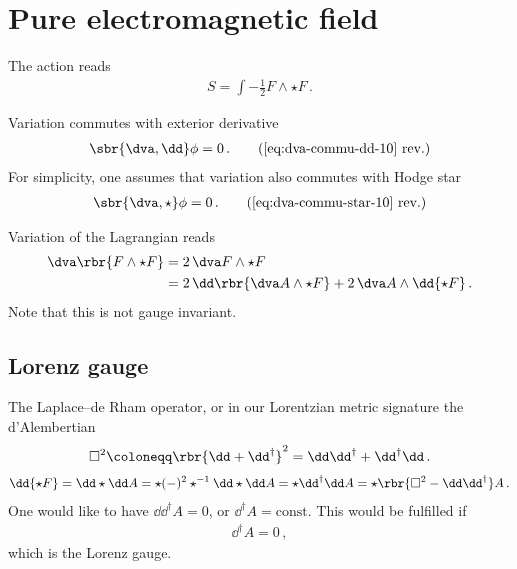 \documentclass[a4paper]{article}
\begin{document}
\section{Pure electromagnetic field}


The action reads
\begin{align}
S = \int -\frac{1}{2} F \wedge \star F\,.
\end{align}

Variation commutes with exterior derivative
\begin{align}
\sbr{\dva, \dd}\phi = 0\,.
\tag{\ref{eq:dva-commu-dd-10} rev.}
\end{align}
For simplicity, one assumes that variation also commutes with Hodge star
\begin{align}
\sbr{\dva, \star}\phi = 0\,.
\tag{\ref{eq:dva-commu-star-10} rev.}
\end{align}

Variation of the Lagrangian reads
\begin{align}
\dva \rbr{F\wedge\star F} &=
	2\,\dva F \wedge \star F
\\ &=
	2\,\dd\rbr{\dva A \wedge \star F} + 2\,\dva A \wedge \dd {\star F}\,.
\end{align}
Note that this is not gauge invariant.

\subsection{Lorenz gauge}
The Laplace--de Rham operator, or in our Lorentzian metric signature the 
d'Alembertian
\begin{align}
\square^2 \coloneqq \rbr{\dd + \dd^{\dagger}}^2 =
	\dd \dd^{\dagger} + \dd^{\dagger} \dd\,.
\end{align}
\begin{align}
\dd{\star F} = \dd\star \dd A = \star (-)^2 \star^{-1}\dd\star\dd A =
	\star \dd^{\dagger} \dd A = \star\rbr{\square^2 - \dd \dd^{\dagger}} A\,.
\end{align}
One would like to have $\dd \dd^{\dagger} A = 0$, or $\dd^{\dagger} A = 
\text{const}$. This would be fulfilled if
\begin{align}
\dd^{\dagger} A = 0\,,
\end{align}
which is the Lorenz gauge\cite{Lorenz1867,Bladel1991a,Bladel1991b}.
\end{document}
